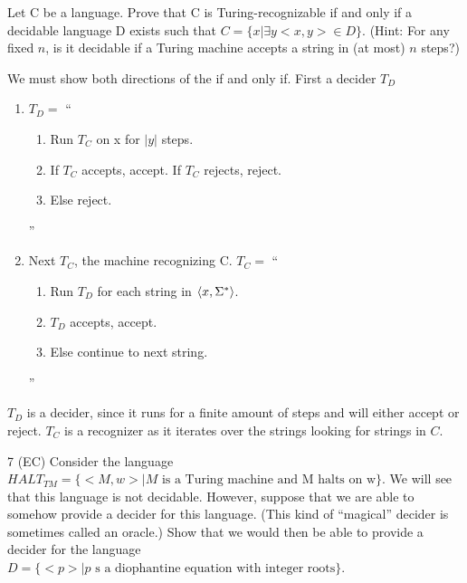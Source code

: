 \begin{problem}{6}
  Let C be a language. Prove that C is Turing-recognizable if and only if a decidable language D exists such that $C =
  \{x | \exists y <x,y> \in D\}$. (Hint: For any fixed $n$, is it decidable if a Turing machine accepts a string in (at
  most) $n$ steps?)
  \begin{solution}
    We must show both directions of the if and only if. First a decider $T_D$
    \begin{enumerate}
      \item $T_D =$ ``
        \begin{enumerate}
          \item Run $T_C$ on x for $|y|$ steps.
          \item If $T_C$ accepts, accept. If $T_C$ rejects, reject.
          \item Else reject.
        \end{enumerate}
      ''\\
      \item Next $T_C$, the machine recognizing C. $T_C =$ ``
        \begin{enumerate}
          \item Run $T_D$ for each string in $\left \langle x, \Sigma^* \right \rangle $.\\
          \item $T_D$ accepts, accept.\\
          \item Else continue to next string.\\
        \end{enumerate}
      ''
    \end{enumerate}
    $T_D$ is a decider, since it runs for a finite amount of steps and will either accept or reject. $T_C$ is a
    recognizer as it iterates over the strings looking for strings in $C$.
  \end{solution}
\end{problem}

\begin{problem}{7 (EC)}
  Consider the language $HALT_{TM} = \{<M,w> | M \text{ is a Turing machine and M halts on w} \}$. We will see that this
  language is not decidable. However, suppose that we are able to somehow provide a decider for this language. (This
  kind of ``magical'' decider is sometimes called an oracle.) Show that we would then be able to provide a decider for
  the language $D = \{<p> | p \text{ s a diophantine equation with integer roots}\}$.
\end{problem}


